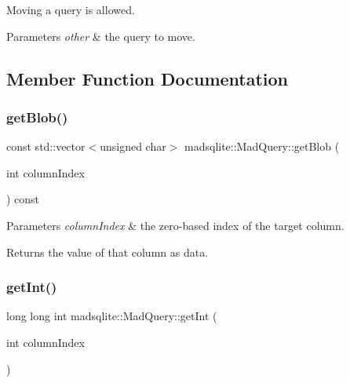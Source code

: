 Moving a query is allowed.


\begin{DoxyParams}{Parameters}
{\em other} & the query to move. \\
\hline
\end{DoxyParams}


\subsection{Member Function Documentation}
\hypertarget{classmadsqlite_1_1_mad_query_a4f39ec059990e88d11b3d11244283000}{}\label{classmadsqlite_1_1_mad_query_a4f39ec059990e88d11b3d11244283000} 
\subsubsection{\texorpdfstring{get\+Blob()}{getBlob()}}
{\footnotesize\ttfamily const std\+::vector$<$unsigned char$>$ madsqlite\+::\+Mad\+Query\+::get\+Blob (\begin{DoxyParamCaption}\item[{int}]{column\+Index }\end{DoxyParamCaption}) const}


\begin{DoxyParams}{Parameters}
{\em column\+Index} & the zero-\/based index of the target column. \\
\hline
\end{DoxyParams}
\begin{DoxyReturn}{Returns}
the value of that column as data. 
\end{DoxyReturn}
\hypertarget{classmadsqlite_1_1_mad_query_ab04d59c89fccfd773f77276219f4d376}{}\label{classmadsqlite_1_1_mad_query_ab04d59c89fccfd773f77276219f4d376} 
\subsubsection{\texorpdfstring{get\+Int()}{getInt()}}
{\footnotesize\ttfamily long long int madsqlite\+::\+Mad\+Query\+::get\+Int (\begin{DoxyParamCaption}\item[{int}]{column\+Index }\end{DoxyParamCaption})}


